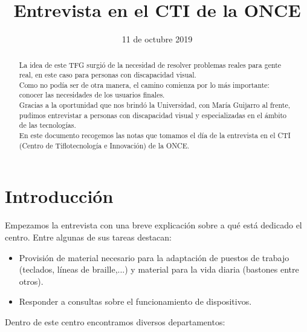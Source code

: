 \documentclass{article}
\title{\Huge Entrevista en el CTI de la ONCE}
\date{11 de octubre 2019}
\begin{document}
	
	\begin{titlepage}
		\maketitle
		\thispagestyle{empty}
	\end{titlepage}
	
	\begin{abstract}
		La idea de este TFG surgió de la necesidad de resolver problemas reales para gente real, en este caso para personas con discapacidad visual.
		\\
		Como no podía ser de otra manera, el camino comienza por lo más importante: conocer las necesidades de los usuarios finales.
		\\
		Gracias a la oportunidad que nos  brindó la Universidad, con María Guijarro al frente, pudimos entrevistar a personas con discapacidad visual y especializadas en el ámbito de las tecnologías.
		\\
		En este documento recogemos las notas que tomamos el día de la entrevista en el CTI (Centro de Tiflotecnología e Innovación)  de la ONCE.
		
	\end{abstract}
	
	\section{Introducción}
	
	Empezamos la entrevista con una breve explicación sobre a qué está dedicado el centro. Entre algunas de sus tareas destacan:
	
	 \begin{itemize}
		\item Provisión de material necesario para la adaptación de puestos de trabajo (teclados, líneas de braille,...) y material para la vida diaria (bastones entre otros).
		\item Responder a consultas sobre el funcionamiento de dispositivos.
	\end{itemize}
	
	Dentro de este centro encontramos diversos departamentos:
	
\end{document}
